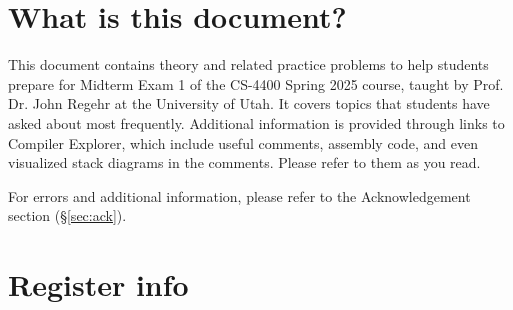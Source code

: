 \documentclass{article}
\begin{document}
\section{What is this document?}
This document contains theory and related practice problems to help students prepare for Midterm Exam 1 of the CS-4400 Spring 2025 course, taught by Prof. Dr. John Regehr at the University of Utah. It covers topics that students have asked about most frequently. Additional information is provided through links to Compiler Explorer, which include useful comments, assembly code, and even visualized stack diagrams in the comments. Please refer to them as you read.

For errors and additional information, please refer to the Acknowledgement section (\S\ref{sec:ack}).
\clearpage
\section{Register info}
\renewcommand{\arraystretch}{1.5}
\setlength{\tabcolsep}{8pt}
\end{document}
